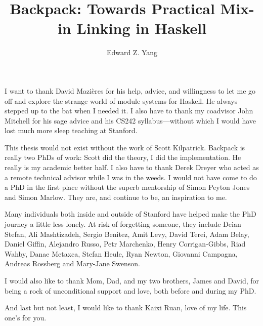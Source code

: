 \documentclass{report}
\begin{document}
\title{Backpack: Towards Practical Mix-in Linking in Haskell}
\author{Edward Z. Yang}

\beforepreface%
    I want to thank David Mazi\`eres for his help, advice, and
    willingness to let me go off and explore the strange world
    of module systems for Haskell.  He always stepped up to the bat
    when I needed it.  I also have to thank my coadvisor John
    Mitchell for his sage advice and his CS242 syllabus---without
    which I would have lost much more sleep teaching at Stanford.

    This thesis would not exist without the work of Scott Kilpatrick.
    Backpack is really two PhDs of work: Scott did the theory, I did the
    implementation.  He really is my academic better half.  I also have
    to thank Derek Dreyer who acted as a remote technical advisor
    while I was in the weeds.
    I would not have come to do a PhD in the first place without the
    superb mentorship of Simon Peyton Jones and Simon Marlow.  They are,
    and continue to be, an inspiration to me.

    Many individuals both inside and outside of Stanford have helped
    make the PhD journey a little less lonely.  At risk of forgetting
    someone, they include Deian Stefan, Ali Mashtizadeh, Sergio Benitez,
    Amit Levy, David Terei, Adam Belay, Daniel Giffin, Alejandro Russo,
    Petr Marchenko, Henry Corrigan-Gibbs, Riad Wahby, Danae Metaxca,
    Stefan Heule, Ryan Newton, Giovanni Campagna, Andreas Rossberg and
    Mary-Jane Swenson.

    I would also like to thank Mom, Dad, and my two brothers, James
    and David, for being a rock of unconditional support and love,
    both before and during my PhD.

    And last but not least, I would like to thank Kaixi Ruan, love
    of my life.  This one's for you.
\afterpreface%
















\end{document}
